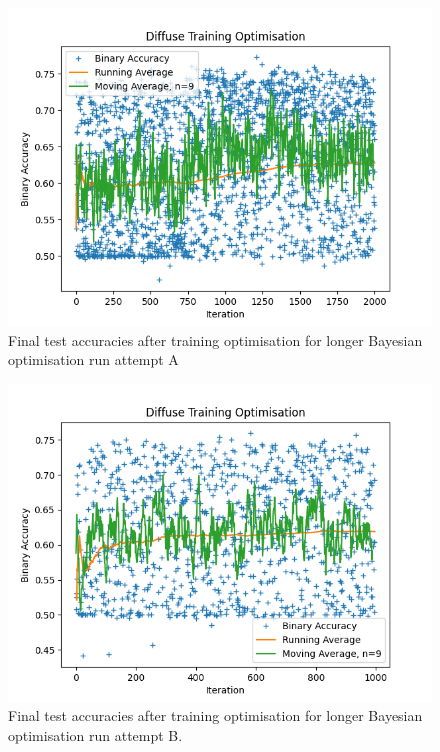 \begin{figure}[h] 
        \centering \includegraphics[width=\columnwidth]{figures/convplot_testfolders3.png}

        \caption{
                \label{fig:convplot_testfolders3} Final test accuracies after  training optimisation for longer Bayesian optimisation run attempt A
        }
\end{figure}
\begin{figure}[h] 
        \centering \includegraphics[width=\columnwidth]{figures/convplot_febtry.png}

        \caption{
                \label{fig:convplot_febtry} Final test accuracies after training optimisation for longer Bayesian optimisation run attempt B.
        }
\end{figure}

